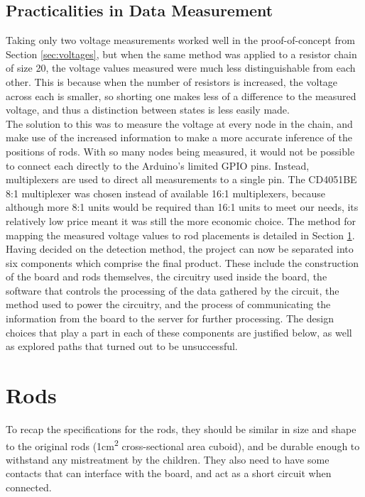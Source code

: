 \subsection{Practicalities in Data Measurement}

\par Taking only two voltage measurements worked well in the proof-of-concept from Section \ref{sec:voltages}, but when the same method was applied to a resistor chain of size 20, the voltage values measured were much less distinguishable from each other. This is because when the number of resistors is increased, the voltage across each is smaller, so shorting one makes less of a difference to the measured voltage, and thus a distinction between states is less easily made. \\

The solution to this was to measure the voltage at every node in the chain, and make use of the increased information to make a more accurate inference of the positions of rods. With so many nodes being measured, it would not be possible to connect each directly to the Arduino's limited GPIO pins. Instead, multiplexers are used to direct all measurements to a single pin. The CD4051BE 8:1 multiplexer \cite{CD4051BE27:online} was chosen instead of available 16:1 multiplexers, because although more 8:1 units would be required than 16:1 units to meet our needs, its relatively low price meant it was still the more economic choice. The method for mapping the measured voltage values to rod placements is detailed in Section \ref{sec:rods}. \\

Having decided on the detection method, the project can now be separated into six components which comprise the final product. These include the construction of the board and rods themselves, the circuitry used inside the board, the software that controls the processing of the data gathered by the circuit, the method used to power the circuitry, and the process of communicating the information from the board to the server for further processing. The design choices that play a part in each of these components are justified below, as well as explored paths that turned out to be unsuccessful.\\ 




\section{Rods}
\label{sec:rods}
To recap the specifications for the rods, they should be similar in size and shape to the original rods (1cm\textsuperscript{2} cross-sectional area cuboid), and be durable enough to withstand any mistreatment by the children. They also need to have some contacts that can interface with the board, and act as a short circuit when connected. 


